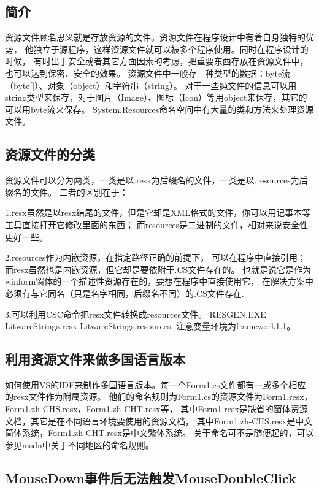 \documentclass{book}
\begin{document}
\subsection{简介}

资源文件顾名思义就是存放资源的文件。资源文件在程序设计中有着自身独特的优势，
他独立于源程序，这样资源文件就可以被多个程序使用。同时在程序设计的时候，
有时出于安全或者其它方面因素的考虑，把重要东西存放在资源文件中，也可以达到保密、安全的效果。
资源文件中一般存三种类型的数据：byte流（byte[]）、对象（object）和字符串（string）。
对于一些纯文件的信息可以用string类型来保存，对于图片（Image）、图标（Icon）等用object来保存，其它的可以用byte流来保存。
System.Resources命名空间中有大量的类和方法来处理资源文件。

\subsection{资源文件的分类}

资源文件可以分为两类，一类是以.resx为后缀名的文件，一类是以.resources为后缀名的文件。
二者的区别在于：

1.resx虽然是以resx结尾的文件，但是它却是XML格式的文件，你可以用记事本等工具直接打开它修改里面的东西；
而resources是二进制的文件，相对来说安全性更好一些。

2.resources作为内嵌资源，在指定路径正确的前提下，
可以在程序中直接引用；而resx虽然也是内嵌资源，但它却是要依附于.CS文件存在的。
也就是说它是作为winform窗体的一个描述性资源存在的，要想在程序中直接使用它，
在解决方案中必须有与它同名（只是名字相同，后缀名不同）的.CS文件存在.

3.可以利用CSC命令把resx文件转换成resources文件。
RESGEN.EXE LitwareStrings.resx LitwareStrings.resources.
注意变量环境为framework1.1。

\subsection{利用资源文件来做多国语言版本}

如何使用VS的IDE来制作多国语言版本。每一个Form1.cs文件都有一或多个相应的resx文件作为附属资源。
他们的命名规则为Form1.cs的资源文件为Form1.resx，Form1.zh-CHS.resx，Form1.zh-CHT.resx等，
其中Form1.resx是缺省的窗体资源文档，其它是在不同语言环境要使用的资源文档，
其中Form1.zh-CHS.resx是中文简体系统，Form1.zh-CHT.resx是中文繁体系统。
关于命名可不是随便起的，可以参见msdn中关于不同地区的命名规则。

\subsection{MouseDown事件后无法触发MouseDoubleClick}
\end{document}
